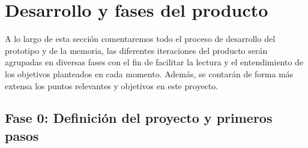 \chapter{Desarrollo y fases del producto}
A lo largo de esta sección comentaremos todo el proceso de desarrollo del prototipo y de la 
memoria, las diferentes iteraciones del producto serán agrupadas en diversas fases con el fin
de facilitar la lectura y el entendimiento de los objetivos planteados en cada momento. Además,
se contarán de forma más extensa los puntos relevantes y objetivos en este proyecto.

\section{Fase 0: Definición del proyecto y primeros pasos}

